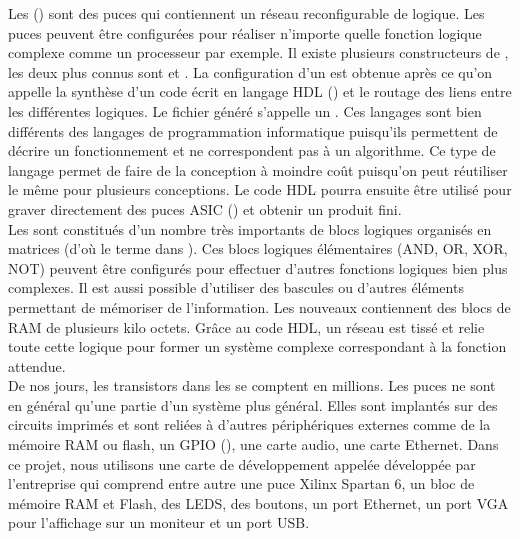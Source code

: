 
Les \fpgas{} () sont des puces qui contiennent un réseau reconfigurable de logique. Les puces peuvent être configurées pour réaliser n'importe quelle fonction logique complexe comme un processeur par exemple. Il existe plusieurs constructeurs de \fpgas{}, les deux plus connus sont  et . La configuration d'un \fpga{} est obtenue après ce qu'on appelle la synthèse d'un code écrit en langage HDL () et le routage des liens entre les différentes logiques. Le fichier généré s'appelle un . Ces langages sont bien différents des langages de programmation informatique puisqu'ils permettent de décrire un fonctionnement et ne correspondent pas à un algorithme. Ce type de langage permet de faire de la conception  à moindre coût puisqu'on peut réutiliser le même \fpga{} pour plusieurs conceptions. Le code HDL pourra ensuite être utilisé pour graver directement des puces ASIC () et obtenir un produit fini.\\

Les \fpgas{} sont constitués d'un nombre très importants de blocs logiques organisés en matrices (d'où le terme  dans \fpga{}). Ces blocs logiques élémentaires (AND, OR, XOR, NOT) peuvent être configurés pour effectuer d'autres fonctions logiques bien plus complexes. Il est aussi possible d'utiliser des bascules ou d'autres éléments permettant de mémoriser de l'information. Les nouveaux \fpgas{} contiennent des blocs de RAM de plusieurs kilo octets. Grâce au code HDL, un réseau est tissé et relie toute cette logique pour former un système complexe correspondant à la fonction attendue.\\

De nos jours, les transistors dans les \fpgas{} se comptent en millions. Les puces \fpga{} ne sont en général qu'une partie d'un système plus général. Elles sont implantés sur des circuits imprimés et sont reliées à d'autres périphériques externes comme de la mémoire RAM ou flash, un GPIO (), une carte audio, une carte Ethernet. Dans ce projet, nous utilisons une carte de développement appelée \nexys{} développée par l'entreprise  qui comprend entre autre une puce \fpga{} Xilinx Spartan 6, un bloc de mémoire RAM et Flash, des LEDS, des boutons, un port Ethernet, un port VGA pour l'affichage sur un moniteur et un port USB.